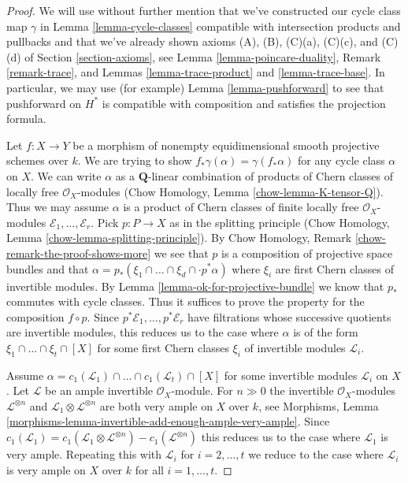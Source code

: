 \documentclass{stacks-project}
\theoremstyle{plain}
\theoremstyle{definition}
\theoremstyle{remark}
\numberwithin{equation}{subsection}
\begin{document}
\begin{proof}
We will use without further mention that we've constructed our
cycle class map $\gamma$ in Lemma \ref{lemma-cycle-classes}
compatible with intersection products and pullbacks and that
we've already shown axioms
(A), (B), (C)(a), (C)(c), and (C)(d) of Section \ref{section-axioms}, see
Lemma \ref{lemma-poincare-duality},
Remark \ref{remark-trace}, and
Lemmas \ref{lemma-trace-product} and \ref{lemma-trace-base}.
In particular, we may use (for example) Lemma \ref{lemma-pushforward}
to see that pushforward on $H^*$ is compatible with composition
and satisfies the projection formula.

\medskip\noindent
Let $f : X \to Y$ be a morphism of nonempty
equidimensional smooth projective schemes over $k$.
We are trying to show $f_*\gamma(\alpha) = \gamma(f_*\alpha)$
for any cycle class $\alpha$ on $X$.
We can write $\alpha$ as a $\mathbf{Q}$-linear combination of products of
Chern classes of locally free $\mathcal{O}_X$-modules
(Chow Homology, Lemma \ref{chow-lemma-K-tensor-Q}).
Thus we may assume $\alpha$ is a product of Chern classes of
finite locally free $\mathcal{O}_X$-modules
$\mathcal{E}_1, \ldots, \mathcal{E}_r$.
Pick $p : P \to X$ as in the splitting principle
(Chow Homology, Lemma \ref{chow-lemma-splitting-principle}).
By Chow Homology, Remark \ref{chow-remark-the-proof-shows-more}
we see that $p$ is a composition of projective space bundles and
that $\alpha = p_*(\xi_1 \cap \ldots \cap \xi_d \cap \cdot p^*\alpha)$
where $\xi_i$ are first Chern classes of invertible modules.
By Lemma \ref{lemma-ok-for-projective-bundle}
we know that $p_*$ commutes with cycle classes.
Thus it suffices to prove the property for the composition
$f \circ p$. Since $p^*\mathcal{E}_1, \ldots, p^*\mathcal{E}_r$
have filtrations whose successive quotients are invertible
modules, this reduces us to the case where $\alpha$ is
of the form $\xi_1 \cap \ldots \cap \xi_t \cap [X]$
for some first Chern classes $\xi_i$ of invertible modules $\mathcal{L}_i$.

\medskip\noindent
Assume
$\alpha = c_1(\mathcal{L}_1) \cap \ldots \cap c_1(\mathcal{L}_t) \cap [X]$
for some invertible modules $\mathcal{L}_i$ on $X$.
Let $\mathcal{L}$ be an ample invertible $\mathcal{O}_X$-module.
For $n \gg 0$ the invertible $\mathcal{O}_X$-modules
$\mathcal{L}^{\otimes n}$ and
$\mathcal{L}_1 \otimes \mathcal{L}^{\otimes n}$ are both
very ample on $X$ over $k$, see
Morphisms, Lemma \ref{morphisms-lemma-invertible-add-enough-ample-very-ample}.
Since $c_1(\mathcal{L}_1) = c_1(\mathcal{L}_1 \otimes \mathcal{L}^{\otimes n})
- c_1(\mathcal{L}^{\otimes n})$ this reduces us to the case where
$\mathcal{L}_1$ is very ample. Repeating this with $\mathcal{L}_i$
for $i = 2, \ldots, t$ we reduce to the case where $\mathcal{L}_i$
is very ample on $X$ over $k$ for all $i = 1, \ldots, t$.


\end{proof}
\end{document}
